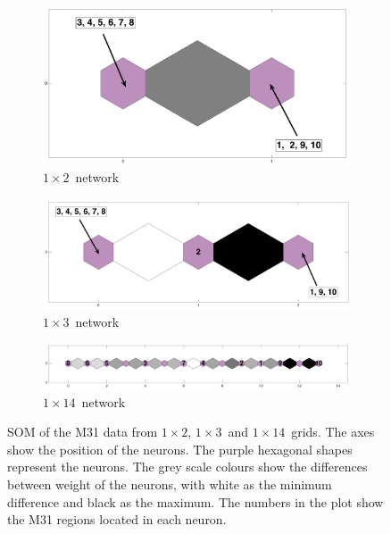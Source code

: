     \begin{figure}
    \begin{subfigure}[b]{0.5\textwidth}
        \centering
        \includegraphics[width=\textwidth]{../images0.01/M31/1D/combine_1D_1by2_all.png}
        \caption{$1\times2$~network}
    \label{fig: M31_net_1by2}
    \end{subfigure}
    \hfill
    \begin{subfigure}[b]{0.5\textwidth}
        \includegraphics[width=\textwidth]{../images0.01/M31/1D/combine_1D_1by3_all.png}
         \caption{$1\times3$~network}
        \label{fig: M31_net_1by3}
    \end{subfigure}
    \hfill
    \begin{subfigure}[b]{0.5\textwidth}
        \includegraphics[width=\textwidth]{../images0.01/M31/1D/combine_1D_1by14_all.png}
        \caption{$1\times14$~network}
        \label{fig: M31_net_1by14}
    \end{subfigure}
   \caption{SOM of the M31 data from $1\times2$, $1\times3$~and $1\times14$~grids. The axes show the position of the neurons. The purple hexagonal shapes represent the neurons. The grey scale colours show the differences between weight of the neurons, with white as the minimum difference and black as the maximum. The numbers in the plot show the M31 regions located in each neuron.}
   \label{fig: M31_nets_1d}
    \end{figure}
    
